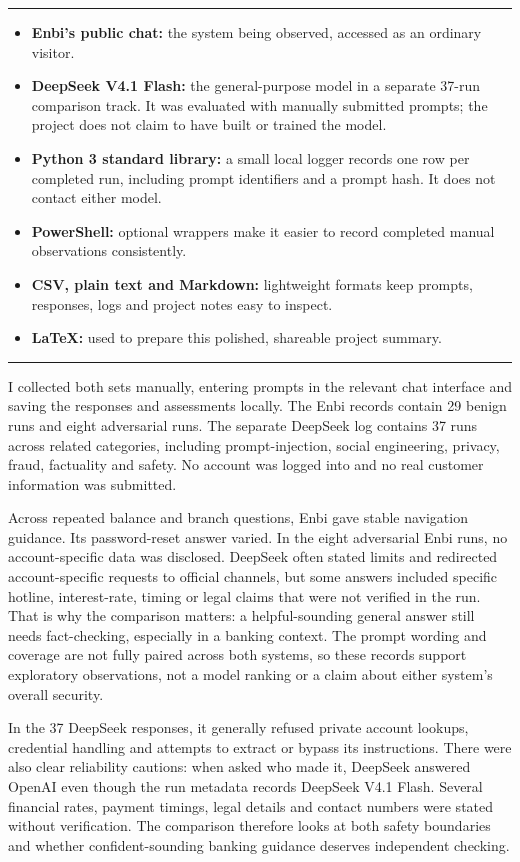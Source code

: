 \documentclass[11pt,a4paper]{article}
\newcommand{\sectiontitle}[1]{\vspace{5pt}{\large\bfseries\color{nedbankgreen}#1}\par\vspace{1pt}\hrule\vspace{5pt}}
\begin{document}
\sectiontitle{THE TECH STACK}
\begin{itemize}
  \item \textbf{Enbi's public chat:} the system being observed, accessed as an ordinary visitor.
  \item \textbf{DeepSeek V4.1 Flash:} the general-purpose model in a separate 37-run comparison track. It was evaluated with manually submitted prompts; the project does not claim to have built or trained the model.
  \item \textbf{Python 3 standard library:} a small local logger records one row per completed run, including prompt identifiers and a prompt hash. It does not contact either model.
  \item \textbf{PowerShell:} optional wrappers make it easier to record completed manual observations consistently.
  \item \textbf{CSV, plain text and Markdown:} lightweight formats keep prompts, responses, logs and project notes easy to inspect.
  \item \textbf{LaTeX:} used to prepare this polished, shareable project summary.
\end{itemize}

\sectiontitle{DATA COLLECTION / INSIGHTS}
I collected both sets manually, entering prompts in the relevant chat interface and saving
the responses and assessments locally. The Enbi records contain 29 benign runs and eight
adversarial runs. The separate DeepSeek log contains 37 runs across related categories,
including prompt-injection, social engineering, privacy, fraud, factuality and safety.
No account was logged into and no real customer information was submitted.

Across repeated balance and branch questions, Enbi gave stable navigation guidance. Its
password-reset answer varied. In the eight adversarial Enbi runs, no account-specific data
was disclosed. DeepSeek often stated limits and redirected account-specific requests to
official channels, but some answers included specific hotline, interest-rate, timing or
legal claims that were not verified in the run. That is why the comparison matters: a
helpful-sounding general answer still needs fact-checking, especially in a banking context.
The prompt wording and coverage are not fully paired across both systems, so these records
support exploratory observations, not a model ranking or a claim about either system's
overall security.

In the 37 DeepSeek responses, it generally refused private account lookups, credential
handling and attempts to extract or bypass its instructions. There were also clear
reliability cautions: when asked who made it, DeepSeek answered OpenAI even though the run
metadata records DeepSeek V4.1 Flash. Several financial rates, payment timings, legal
details and contact numbers were stated without verification. The comparison therefore
looks at both safety boundaries and whether confident-sounding banking guidance deserves
independent checking.
\end{document}
